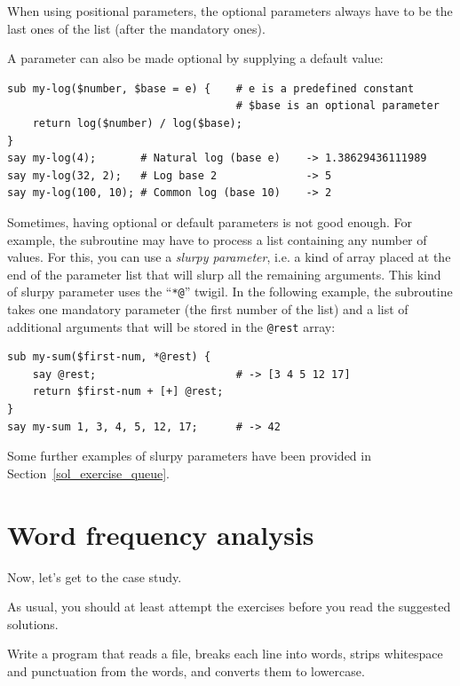 When using positional parameters, the optional parameters 
always have to be the last ones of the list (after the 
mandatory ones).

A parameter can also be made optional by supplying a default 
value:

\begin{verbatim}
sub my-log($number, $base = e) {    # e is a predefined constant
                                    # $base is an optional parameter
    return log($number) / log($base);
}
say my-log(4);       # Natural log (base e)    -> 1.38629436111989
say my-log(32, 2);   # Log base 2              -> 5
say my-log(100, 10); # Common log (base 10)    -> 2
\end{verbatim}

\label{slurpy_parameters}
Sometimes, having optional or default parameters is not good 
enough. For example, the subroutine may have to process a list 
containing any number of values. For this, you can use a 
\emph{slurpy parameter}, i.e. a kind of array placed at the 
end of the parameter list that will slurp all the remaining 
arguments. This kind of slurpy parameter uses the ``\verb"*@"'' 
twigil. In the following example, the subroutine takes one 
mandatory parameter (the first number of the list) and a list 
of additional arguments that will be stored in the \verb'@rest' 
array:

\begin{verbatim}
sub my-sum($first-num, *@rest) {
    say @rest;                      # -> [3 4 5 12 17]
    return $first-num + [+] @rest;
}
say my-sum 1, 3, 4, 5, 12, 17;      # -> 42 
\end{verbatim}

Some further examples of slurpy parameters have been 
provided in Section~\ref{sol_exercise_queue}.

\section{Word frequency analysis}
\label{analysis}

Now, let's get to the case study.

As usual, you should at least attempt the exercises
before you read the suggested solutions.

\begin{exercise}

Write a program that reads a file, breaks each line into
words, strips whitespace and punctuation from the words, and
converts them to lowercase.

\end{exercise}


